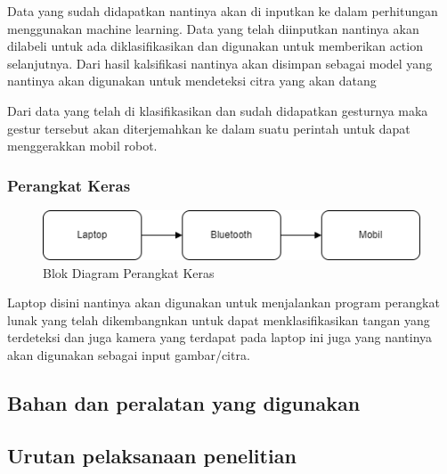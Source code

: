 Data yang sudah didapatkan nantinya akan di inputkan ke dalam perhitungan menggunakan machine learning. Data yang telah diinputkan nantinya akan dilabeli untuk ada diklasifikasikan dan digunakan untuk memberikan action selanjutnya. Dari hasil kalsifikasi nantinya akan disimpan sebagai model yang nantinya akan digunakan untuk mendeteksi citra yang akan datang

Dari data yang telah di klasifikasikan dan sudah didapatkan gesturnya maka gestur tersebut akan diterjemahkan ke dalam suatu perintah untuk dapat menggerakkan mobil robot.

\subsubsection{Perangkat Keras}

\begin{figure}[!htbp]
	\centering
	\includegraphics[width=0.7\linewidth]{"gambar/gambar perangkat keras"}
	\caption{Blok Diagram Perangkat Keras}
	\label{fig:gambar-perangkat-keras}
\end{figure}

Laptop disini nantinya akan digunakan untuk menjalankan program perangkat lunak yang telah dikembangnkan untuk dapat menklasifikasikan tangan yang terdeteksi dan juga kamera yang terdapat pada laptop ini juga yang nantinya akan digunakan sebagai input gambar/citra. 



\subsection{Bahan dan peralatan yang digunakan}

\lipsum[13]
\lipsum[3]

\subsection{Urutan pelaksanaan penelitian}

